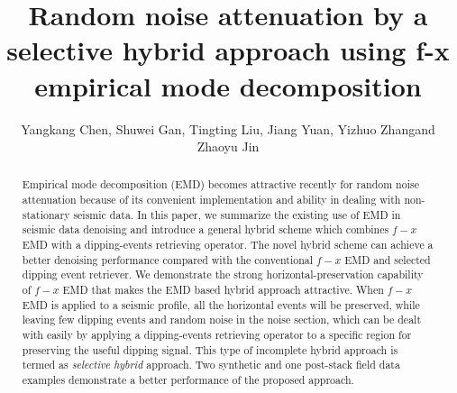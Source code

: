 
\title{Random noise attenuation by a selective hybrid approach using f-x empirical mode decomposition}
\renewcommand{\thefootnote}{\fnsymbol{footnote}}

\author{Yangkang Chen\footnotemark[1], Shuwei Gan\footnotemark[2], Tingting Liu\footnotemark[2], Jiang Yuan\footnotemark[2], Yizhuo Zhang\footnotemark[3] and Zhaoyu Jin\footnotemark[3]}


\address{
\footnotemark[1]Bureau of Economic Geology \\
John A. and Katherine G. Jackson School of Geosciences \\
The University of Texas at Austin \\
University Station, Box X \\
Austin, TX 78713-8924 \\

\footnotemark[2] State Key Laboratory of Petroleum Resources and Prospecting \\
China University of Petroleum \\
Fuxue Road 18th\\
Beijing, China, 102200 \\

\footnotemark[3] Grant Institute, The King's Buildings, West Mains Road \\
University of Edinburgh \\
Edinburgh,UK, EH9 3JW \\
}


\maketitle

\begin{abstract}
Empirical mode decomposition (EMD) becomes attractive recently for random noise attenuation because of its convenient implementation and ability in dealing with non-stationary seismic data. In this paper, we summarize the existing use of EMD in seismic data denoising and introduce a general hybrid scheme which combines $f-x$ EMD with a dipping-events retrieving operator. The novel hybrid scheme can achieve a better denoising performance compared with the conventional $f-x$ EMD and selected dipping event retriever. We demonstrate the strong horizontal-preservation capability of $f-x$ EMD that makes the EMD based hybrid approach attractive. When $f-x$ EMD is applied to a seismic profile, all the horizontal events will be preserved, while leaving few dipping events and random noise in the noise section, which can be dealt with easily by applying a dipping-events retrieving operator to a specific region for preserving the useful dipping signal. This type of incomplete hybrid approach is termed as \textit{selective hybrid} approach. Two synthetic and one post-stack field data examples demonstrate a better performance of the proposed approach.
\end{abstract}

